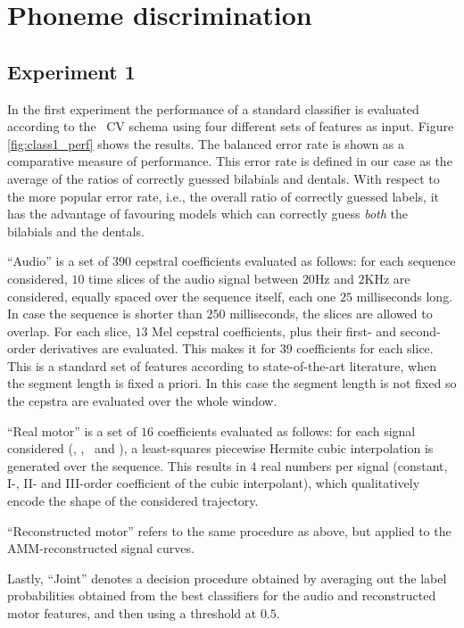 \section{Phoneme discrimination}
\label{sec:class}

\subsection{Experiment 1}
\label{subsec:exp1}

In the first experiment the performance of a standard classifier is evaluated
according to the \overall\ CV schema using four different sets of features as
input. Figure \ref{fig:class1_perf} shows the results. The balanced error rate
is shown as a comparative measure of performance. This error rate is defined in
our case as the average of the ratios of correctly guessed bilabials and dentals.
With respect to the more popular error rate, i.e., the overall ratio of correctly
guessed labels, it has the advantage of favouring models which can correctly guess
\emph{both} the bilabials and the dentals.

``Audio'' is a set of $390$ cepstral coefficients evaluated as follows: for each
sequence considered, $10$ time slices of the audio signal between $20$Hz and $2$KHz
are considered, equally spaced over the sequence itself,
each one $25$ milliseconds long. In case the sequence
is shorter than $250$ milliseconds, the slices are allowed to overlap. For each slice,
$13$ Mel cepstral coefficients, plus their first- and second-order derivatives are
evaluated. This makes it for $39$ coefficients for each slice. This is a standard set
of features according to state-of-the-art literature, when the segment
length is fixed a priori. In this case the segment length is not fixed so the
cepstra are evaluated over the whole window.

``Real motor'' is a set of $16$ coefficients evaluated as follows: for each
signal considered (\vlio, \alio, \vttu\ and \attu), a least-squares piecewise
Hermite cubic interpolation is generated over the sequence. This results in $4$ real
numbers per signal (constant, I-, II- and III-order coefficient of the cubic
interpolant), which qualitatively encode the shape of the considered trajectory.

``Reconstructed motor'' refers to the same procedure as above, but applied
to the AMM-reconstructed signal curves.

Lastly, ``Joint'' denotes a decision procedure obtained by averaging out the
label probabilities obtained from the best classifiers for the audio and
reconstructed motor features, and then using a threshold at $0.5$.

